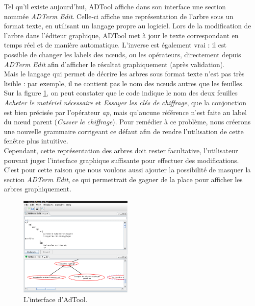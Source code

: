 	Tel qu'il existe aujourd'hui, ADTool affiche dans son interface une section nommée \emph{ADTerm Edit}. Celle-ci affiche une représentation de l'arbre sous un format texte, en utilisant un langage propre au logiciel. Lors de la modification de l'arbre dans l'éditeur graphique, ADTool met à jour le texte correspondant en temps réel et de manière automatique. L'inverse est également vrai : il est possible de changer les labels des nœuds, ou les opérateurs, directement depuis \emph{ADTerm Edit} afin d'afficher le résultat graphiquement (après validation).\\ 

	Mais le langage qui permet de décrire les arbres sous format texte n'est pas très lisible : par exemple, il ne contient pas le nom des nœuds autres que les feuilles. Sur la figure \ref{fig:int_adTool}, on peut constater que le code indique le nom des deux feuilles \textit{Acheter le matériel nécessaire} et \textit{Essayer les clés de chiffrage}, que la conjonction est bien précisée par l'opérateur \textit{ap}, mais qu'aucune référence n'est faite au label du nœud parent (\textit{Casser le chiffrage}). Pour remédier à ce problème, nous créerons une nouvelle grammaire corrigeant ce défaut afin de rendre l'utilisation de cette fenêtre plus intuitive.\\
	
	Cependant, cette représentation des arbres doit rester facultative, l'utilisateur pouvant juger l'interface graphique suffisante pour effectuer des modifications. C'est pour cette raison que nous voulons aussi ajouter la possibilité de masquer la section \emph{ADTerm Edit}, ce qui permettrait de gagner de la place pour afficher les arbres graphiquement. %

	\begin{figure}
		\centering
		\includegraphics[width=0.5\textwidth]{figure/interface_adtool.png}
		\caption{L'interface d'AdTool.}
		\label{fig:int_adTool}
	\end{figure}
	
